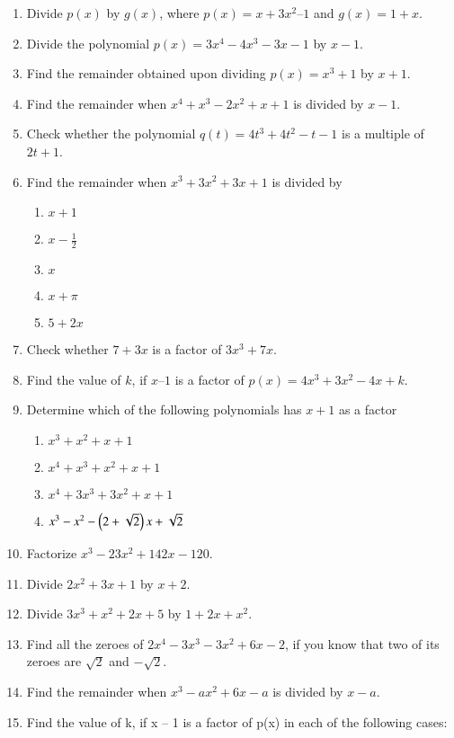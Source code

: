 \begin{enumerate}[label=\thesubsection.\arabic*, ref=\thesubsection.\theenumi,resume*]
%
\item Divide $p(x)$ by $g(x)$, where $p(x) = x + 3x^2– 1$ and $g(x) = 1 + x$.
\item Divide the polynomial $p(x) = 3x^4-4x^3-3x-1 $ by $x-1$.
\item Find the remainder obtained upon dividing $p(x) = x^3+1$ by $x+1$.
\item Find the remainder when $x^4+x^3-2x^2+x+1$ is divided by $x-1$.
\item Check whether the polynomial $q(t)=4t^3+4t^2-t-1$ is a multiple of $2t+1$.
\item Find the remainder when $x^3+3x^2+3x+1$ is divided by 
	\begin{enumerate}
		\item $x+1$
		\item $x-\frac{1}{2}$
		\item $x$
		\item $x+\pi$
		\item $5+2x$
	\end{enumerate}
\item Check whether $7+3x$ is a factor of $3x^3+7x$.
\item Find the value of $k$, if $x – 1$ is a factor of $p(x) = 4x^3+ 3x^2 - 4x + k$.
%
\item Determine which of the following polynomials has $x+1$ as a factor
	\begin{enumerate}
		\item $x^3+x^2+x+1$
		\item $x^4+x^3+x^2+x+1$
		\item $x^4+3x^3+3x^2+x+1$
		\item $x^3-x^2-\left(2+\sqrt{2}\right)x+\sqrt{2}$
	\end{enumerate}
\item Factorize $x^3-23x^2+142x-120$.
\item Divide $2x^2+3x+1$ by $x+2$.
\item Divide $3x^3+x^2+2x+5$ by $1+2x+x^2$.
\item Find all the zeroes of $2x^4-3x^3-3x^2+6x-2$, if you know that two of its zeroes are $\sqrt{2}$ and $-\sqrt{2}$.
\item Find the remainder when $x^3-ax^2 +6x-a$ is divided by $x-a$.
\item Find the value of k, if x – 1 is a factor of p(x) in each of the following cases: 
\begin{enumerate}

\end{enumerate}
\end{enumerate}
